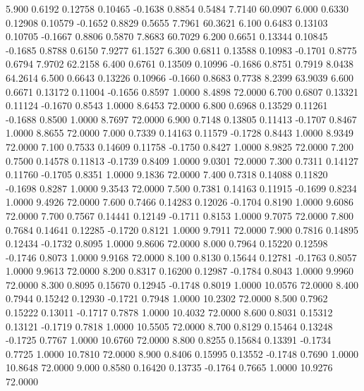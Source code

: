    5.900   0.6192   0.12758   0.10465  -0.1638   0.8854   0.5484   7.7140  60.0907
   6.000   0.6330   0.12908   0.10579  -0.1652   0.8829   0.5655   7.7961  60.3621
   6.100   0.6483   0.13103   0.10705  -0.1667   0.8806   0.5870   7.8683  60.7029
   6.200   0.6651   0.13344   0.10845  -0.1685   0.8788   0.6150   7.9277  61.1527
   6.300   0.6811   0.13588   0.10983  -0.1701   0.8775   0.6794   7.9702  62.2158
   6.400   0.6761   0.13509   0.10996  -0.1686   0.8751   0.7919   8.0438  64.2614
   6.500   0.6643   0.13226   0.10966  -0.1660   0.8683   0.7738   8.2399  63.9039
   6.600   0.6671   0.13172   0.11004  -0.1656   0.8597   1.0000   8.4898  72.0000
   6.700   0.6807   0.13321   0.11124  -0.1670   0.8543   1.0000   8.6453  72.0000
   6.800   0.6968   0.13529   0.11261  -0.1688   0.8500   1.0000   8.7697  72.0000
   6.900   0.7148   0.13805   0.11413  -0.1707   0.8467   1.0000   8.8655  72.0000
   7.000   0.7339   0.14163   0.11579  -0.1728   0.8443   1.0000   8.9349  72.0000
   7.100   0.7533   0.14609   0.11758  -0.1750   0.8427   1.0000   8.9825  72.0000
   7.200   0.7500   0.14578   0.11813  -0.1739   0.8409   1.0000   9.0301  72.0000
   7.300   0.7311   0.14127   0.11760  -0.1705   0.8351   1.0000   9.1836  72.0000
   7.400   0.7318   0.14088   0.11820  -0.1698   0.8287   1.0000   9.3543  72.0000
   7.500   0.7381   0.14163   0.11915  -0.1699   0.8234   1.0000   9.4926  72.0000
   7.600   0.7466   0.14283   0.12026  -0.1704   0.8190   1.0000   9.6086  72.0000
   7.700   0.7567   0.14441   0.12149  -0.1711   0.8153   1.0000   9.7075  72.0000
   7.800   0.7684   0.14641   0.12285  -0.1720   0.8121   1.0000   9.7911  72.0000
   7.900   0.7816   0.14895   0.12434  -0.1732   0.8095   1.0000   9.8606  72.0000
   8.000   0.7964   0.15220   0.12598  -0.1746   0.8073   1.0000   9.9168  72.0000
   8.100   0.8130   0.15644   0.12781  -0.1763   0.8057   1.0000   9.9613  72.0000
   8.200   0.8317   0.16200   0.12987  -0.1784   0.8043   1.0000   9.9960  72.0000
   8.300   0.8095   0.15670   0.12945  -0.1748   0.8019   1.0000  10.0576  72.0000
   8.400   0.7944   0.15242   0.12930  -0.1721   0.7948   1.0000  10.2302  72.0000
   8.500   0.7962   0.15222   0.13011  -0.1717   0.7878   1.0000  10.4032  72.0000
   8.600   0.8031   0.15312   0.13121  -0.1719   0.7818   1.0000  10.5505  72.0000
   8.700   0.8129   0.15464   0.13248  -0.1725   0.7767   1.0000  10.6760  72.0000
   8.800   0.8255   0.15684   0.13391  -0.1734   0.7725   1.0000  10.7810  72.0000
   8.900   0.8406   0.15995   0.13552  -0.1748   0.7690   1.0000  10.8648  72.0000
   9.000   0.8580   0.16420   0.13735  -0.1764   0.7665   1.0000  10.9276  72.0000
